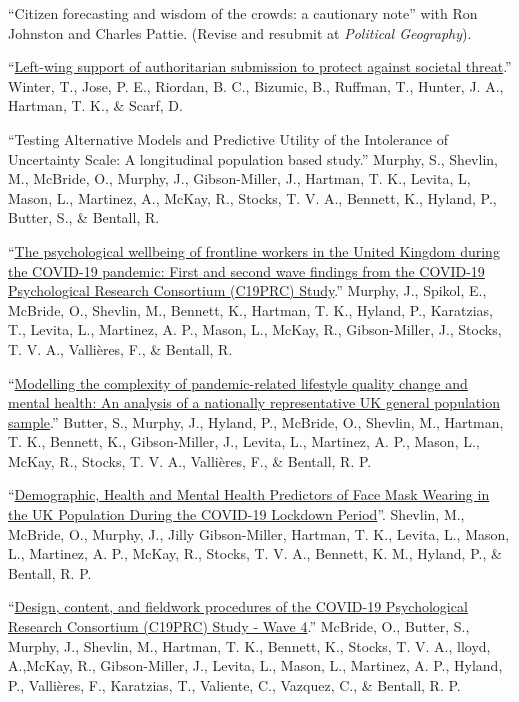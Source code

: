 \documentclass[12pt]{article}
\begin{document}
\begin{bibsection}



\item ``Citizen forecasting and wisdom of the crowds: a cautionary note'' with Ron Johnston and Charles Pattie. (Revise and resubmit at \textit{Political Geography}). 

\item ``\href{https://psyarxiv.com/hu9ef/}{Left-wing support of authoritarian submission to protect against societal threat}.'' Winter, T., Jose, P. E., Riordan, B. C., Bizumic, B., Ruffman, T., Hunter, J. A., Hartman, T. K., \& Scarf, D. 

\item ``Testing Alternative Models and Predictive Utility of the Intolerance of Uncertainty Scale: A longitudinal population based study.''  Murphy, S., Shevlin, M., McBride, O., Murphy, J., Gibson-Miller, J., Hartman, T. K., Levita, L, Mason, L., Martinez, A., McKay, R., Stocks, T. V. A., Bennett, K., Hyland, P., Butter, S., \& Bentall, R. 

\item ``\href{https://psyarxiv.com/dcynw}{The psychological wellbeing of frontline workers in the United Kingdom during the COVID-19 pandemic: First and second wave findings from the COVID-19 Psychological Research Consortium (C19PRC) Study}.'' Murphy, J., Spikol, E., McBride, O., Shevlin, M., Bennett, K., Hartman, T. K.,  Hyland, P., Karatzias, T., Levita, L., Martinez, A. P., Mason, L., McKay, R., Gibson-Miller, J., Stocks, T. V. A., Vallières, F., \& Bentall, R.

\item ``\href{}{Modelling the complexity of pandemic-related lifestyle quality change and mental health: An analysis of a nationally representative UK general population sample}.'' Butter, S.,  Murphy, J., Hyland, P., McBride, O., Shevlin, M., Hartman, T. K., Bennett, K., Gibson-Miller, J., Levita, L., Martinez, A. P., Mason, L., McKay, R., Stocks, T. V. A., Vallières, F., \& Bentall, R. P. 

\item ``\href{https://osf.io/mhj59/}{Demographic, Health and Mental Health Predictors of Face Mask Wearing in the UK Population During the COVID-19 Lockdown Period}''. Shevlin, M.,  McBride, O., Murphy, J., Jilly Gibson-Miller, Hartman, T. K., Levita, L., Mason, L., Martinez, A. P., McKay, R., Stocks, T. V. A., Bennett, K. M., Hyland, P., \& Bentall, R. P.

\item ``\href{https://psyarxiv.com/nytxc/}{Design, content, and fieldwork procedures of the COVID-19 Psychological Research Consortium (C19PRC) Study - Wave 4}.'' McBride, O., Butter, S., Murphy, J., Shevlin, M., Hartman, T. K., Bennett, K.,  Stocks, T. V. A., lloyd, A.,McKay, R.,  Gibson-Miller, J.,  Levita, L., Mason, L., Martinez, A. P.,  Hyland, P., Vallières, F., Karatzias, T., Valiente, C., Vazquez, C., \& Bentall, R. P.  

              
\end{bibsection}
\end{document}
